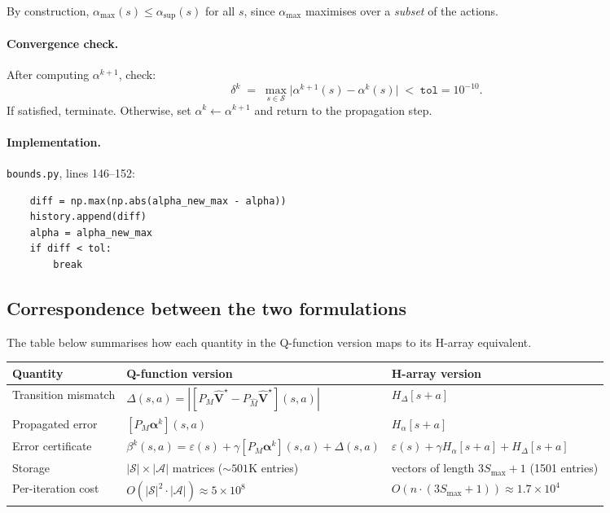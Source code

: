 \documentclass[11pt]{article}
\newcommand{\Smax}{S_{\max}}
\begin{document}
By construction, $\alpha_{\max}(s) \le \alpha_{\sup}(s)$ for all $s$, since
$\alpha_{\max}$ maximises over a \emph{subset} of the actions.

\paragraph{Convergence check.}

After computing $\alpha^{k+1}$, check:
\begin{equation}\label{eq:convergence}
  \delta^k \;=\; \max_{s \in \mathcal{S}} \bigl|\alpha^{k+1}(s) - \alpha^k(s)\bigr|
  \;<\; \texttt{tol} = 10^{-10}.
\end{equation}
If satisfied, terminate.  Otherwise, set $\alpha^k \leftarrow \alpha^{k+1}$ and
return to the propagation step.

\paragraph{Implementation.}
\texttt{bounds.py}, lines 146--152:
\begin{verbatim}
    diff = np.max(np.abs(alpha_new_max - alpha))
    history.append(diff)
    alpha = alpha_new_max
    if diff < tol:
        break
\end{verbatim}

\subsection{Correspondence between the two formulations}

The table below summarises how each quantity in the Q-function version maps to
its H-array equivalent.

\begin{center}
\renewcommand{\arraystretch}{1.3}
\begin{tabular}{lll}
\toprule
\textbf{Quantity} & \textbf{Q-function version} & \textbf{H-array version} \\
\midrule
Transition mismatch
  & $\Delta(s,a) = |[P_M \hat{\mathbf{V}}^\star - P_{\hat M}\hat{\mathbf{V}}^\star](s,a)|$
  & $H_\Delta[s+a]$ \\
Propagated error
  & $[P_M \boldsymbol{\alpha}^k](s,a)$
  & $H_\alpha[s+a]$ \\
Error certificate
  & $\beta^k(s,a) = \varepsilon(s) + \gamma [P_M\boldsymbol{\alpha}^k](s,a) + \Delta(s,a)$
  & $\varepsilon(s) + \gamma H_\alpha[s+a] + H_\Delta[s+a]$ \\
Storage
  & $|\mathcal{S}| \times |\mathcal{A}|$ matrices ($\sim\!501$K entries)
  & vectors of length $3\Smax+1$ (1501 entries) \\
Per-iteration cost
  & $O(|\mathcal{S}|^2 \cdot |\mathcal{A}|) \approx 5 \times 10^8$
  & $O(n \cdot (3\Smax + 1)) \approx 1.7 \times 10^4$ \\
\bottomrule
\end{tabular}
\end{center}
\end{document}
